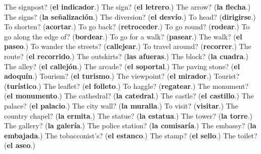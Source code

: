 \begin{tcolorbox}[breakable,colback=teal!4,colframe=teal!35!black,title={Before you move on}]
The signpost? (\textbf{el indicador}.) The sign? (\textbf{el letrero}.) The arrow? (\textbf{la flecha}.) The signs? (\textbf{la señalización}.) The diversion? (\textbf{el desvío}.) To head? (\textbf{dirigirse}.) To shorten? (\textbf{acortar}.) To go back? (\textbf{retroceder}.) To go round? (\textbf{rodear}.) To go along the edge of? (\textbf{bordear}.) To go for a walk? (\textbf{pasear}.) The walk? (\textbf{el paseo}.) To wander the streets? (\textbf{callejear}.) To travel around? (\textbf{recorrer}.) The route? (\textbf{el recorrido}.) The outskirts? (\textbf{las afueras}.) The block? (\textbf{la cuadra}.) The alley? (\textbf{el callejón}.) The arcade? (\textbf{el soportal}.) The paving stone? (\textbf{el adoquín}.) Tourism? (\textbf{el turismo}.) The viewpoint? (\textbf{el mirador}.) Tourist? (\textbf{turístico}.) The leaflet? (\textbf{el folleto}.) To haggle? (\textbf{regatear}.) The monument? (\textbf{el monumento}.) The cathedral? (\textbf{la catedral}.) The castle? (\textbf{el castillo}.) The palace? (\textbf{el palacio}.) The city wall? (\textbf{la muralla}.) To visit? (\textbf{visitar}.) The country chapel? (\textbf{la ermita}.) The statue? (\textbf{la estatua}.) The tower? (\textbf{la torre}.) The gallery? (\textbf{la galería}.) The police station? (\textbf{la comisaría}.) The embassy? (\textbf{la embajada}.) The tobacconist’s? (\textbf{el estanco}.) The stamp? (\textbf{el sello}.) The toilet? (\textbf{el aseo}.)
\end{tcolorbox}
